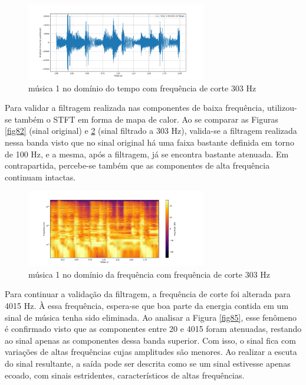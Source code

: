 \begin{figure}[h]
    \centering
    \includegraphics[width=0.7\textwidth]{figuras/fig83.png}
    \caption{música 1 no domínio do tempo com frequência de corte 303 Hz}
    \label{fig83}
\end{figure}

Para validar a filtragem realizada nas componentes de baixa frequência, utilizou-se também o STFT em forma de mapa de calor. Ao se comparar as Figuras \ref{fig82} (sinal original) e \ref{fig84} (sinal filtrado a 303 Hz), valida-se a filtragem realizada nessa banda visto que no sinal original há uma faixa bastante definida em torno de 100 Hz, e a mesma, após a filtragem, já se encontra bastante atenuada. Em contrapartida, percebe-se também que as componentes de alta frequência continuam intactas. 

\begin{figure}[h]
    \centering
    \includegraphics[width=0.7\textwidth]{figuras/fig84.png}
    \caption{música 1 no domínio da frequência com frequência de corte 303 Hz}
    \label{fig84}
\end{figure}

Para continuar a validação da filtragem, a frequência de corte foi alterada para 4015 Hz. À essa frequência, espera-se que boa parte da energia contida em um sinal de música tenha sido eliminada. Ao analisar a Figura \ref{fig85}, esse fenômeno é confirmado visto que as componentes entre 20 e 4015 foram atenuadas, restando ao sinal apenas as componentes dessa banda superior. Com isso, o sinal fica com variações de altas frequências cujas amplitudes são menores. Ao realizar a escuta do sinal resultante, a saída pode ser descrita como se um sinal estivesse apenas ecoado, com sinais estridentes, característicos de altas frequências. 

